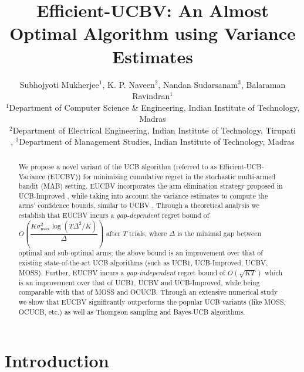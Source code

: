 \documentclass[letterpaper]{article} %
\begin{document}
%
\title{Efficient-UCBV: An Almost Optimal Algorithm using Variance Estimates}
\author{Subhojyoti Mukherjee${}^1$, K. P. Naveen${}^2$, Nandan
Sudarsanam${}^3$, Balaraman Ravindran${}^1$\\
${}^1$Department of Computer Science \& Engineering, Indian Institute of
Technology, Madras\\ ${}^2$Department of Electrical Engineering, Indian Institute of
Technology, Tirupati\\,
${}^3$Department of Management Studies, Indian Institute of
Technology, Madras}


\maketitle

\begin{abstract}
We propose a novel variant of the UCB algorithm (referred to as Efficient-UCB-Variance (EUCBV)) for minimizing cumulative regret in the stochastic multi-armed bandit (MAB) setting. EUCBV incorporates the arm elimination strategy proposed in UCB-Improved \citep{auer2010ucb}, while taking into account the variance estimates to compute the arms' confidence bounds, similar to UCBV \citep{audibert2009exploration}. Through a theoretical analysis we establish that EUCBV incurs a \emph{gap-dependent} regret bound of {\scriptsize $O\left( \dfrac{K\sigma^2_{\max} \log (T\Delta^2 /K)}{\Delta}\right)$} after $T$ trials, where $\Delta$ is the minimal gap between optimal and sub-optimal arms; the above bound is an improvement over that of existing state-of-the-art UCB algorithms (such as UCB1, UCB-Improved, UCBV,  MOSS). Further, EUCBV incurs a \emph{gap-independent} regret bound of {\scriptsize $O\left(\sqrt{KT}\right)$}  which is an improvement over that of UCB1, UCBV and UCB-Improved, while being comparable with that of MOSS and OCUCB. Through an extensive numerical study we show that EUCBV significantly outperforms the popular UCB variants (like MOSS, OCUCB, etc.) as well as Thompson sampling and Bayes-UCB algorithms. 

\end{abstract}

\section{Introduction}
\label{sec:intro}

\end{document}
